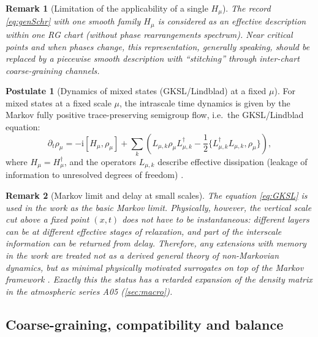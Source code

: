 \documentclass[11pt,a4paper]{article}
\newcommand{\ii}{\mathrm{i}}
\theoremstyle{definition}
\newtheorem{axiom}{Postulate}[section]
\theoremstyle{plain}
\newtheorem{remark}{Remark}[section]
\theoremstyle{remark}
\begin{document}
\begin{remark}[Limitation of the applicability of a single $H_\mu$]\label{rem:Hmu_scope}
The record \eqref{eq:genSchr} with one smooth family $H_\mu$ is considered as an effective description
within one RG chart (without phase rearrangements spectrum).
Near critical points and when phases change, this representation, generally speaking, should be replaced by a
piecewise smooth description with “stitching” through inter-chart coarse-graining channels.
\end{remark}

\begin{axiom}[Dynamics of mixed states (GKSL/Lindblad) at a fixed $\mu$]\label{ax:GKSL}
For mixed states at a fixed scale $\mu$, the intrascale time dynamics is given by the
Markov fully positive trace-preserving semigroup flow, i.e.\ the GKSL/Lindblad equation:
\begin{equation}\label{eq:GKSL}
\partial_t \rho_\mu
=
-\ii[H_\mu,\rho_\mu]
+\sum_k\left(
L_{\mu,k}\rho_\mu L_{\mu,k}^\dagger
-\frac12\{L_{\mu,k}^\dagger L_{\mu,k},\rho_\mu\}
\right),
\end{equation}
where $H_\mu=H_\mu^\dagger$, and the operators $L_{\mu,k}$ describe effective dissipation (leakage of information
to unresolved degrees of freedom) \cite{GoriniKossakowskiSudarshan1976GKSL,Lindblad1976Generators}.
\end{axiom}

\begin{remark}[Markov limit and delay at small scales]\label{rem:memory}
The equation \eqref{eq:GKSL} is used in the work as the basic Markov limit.
Physically, however, the vertical scale cut above a fixed point $(x,t)$ does not have to be instantaneous:
different layers can be at different effective stages of relaxation, and part of the interscale information can be returned from delay.
Therefore, any extensions with memory in the work are treated not as a derived general theory of non-Markovian dynamics,
but as minimal physically motivated surrogates on top of the Markov framework \cite{BreuerPetruccione2002OpenQuantum,BreuerLainePiiloVacchini2016Colloquium}.
Exactly this the status has a retarded expansion of the density matrix in the atmospheric series A05 (\cref{sec:macro}).
\end{remark}

\subsection{Coarse-graining, compatibility and balance}
\label{sec:axioms:coarse}
\end{document}
